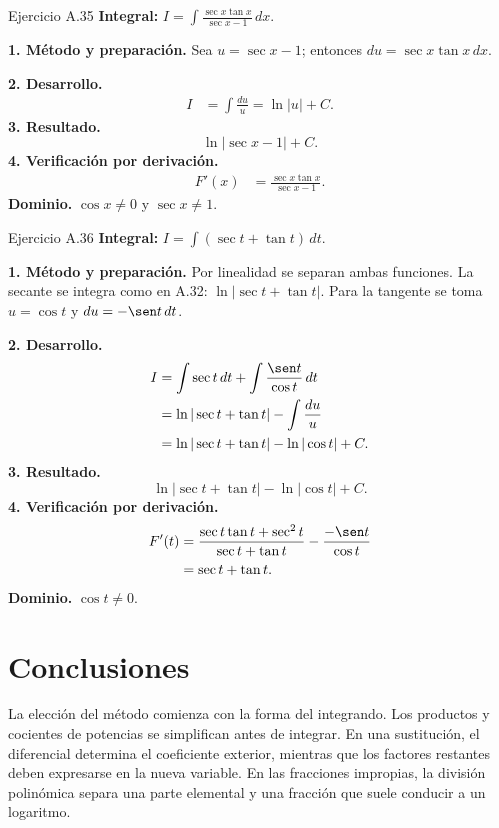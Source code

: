 \begin{examplebox}{Ejercicio A.35}
\textbf{Integral:} $\displaystyle I=\int \frac{\sec x\tan x}{\sec x-1}\,dx$.

\textbf{1. Método y preparación.} Sea $u=\sec x-1$; entonces $du=\sec x\tan x\,dx$.

\textbf{2. Desarrollo.}
\begin{align*}
I&=\int\frac{du}{u}=\ln|u|+C.
\end{align*}
\textbf{3. Resultado.}
\[
\ln|\sec x-1|+C.
\]
\textbf{4. Verificación por derivación.}
\begin{align*}
F'(x)&=\frac{\sec x\tan x}{\sec x-1}.
\end{align*}
\textbf{Dominio.} $\cos x\ne0$ y $\sec x\ne1$.
\end{examplebox}

\begin{examplebox}{Ejercicio A.36}
\textbf{Integral:} $\displaystyle I=\int (\sec t+\tan t)\,dt$.

\textbf{1. Método y preparación.} Por linealidad se separan ambas funciones. La secante se integra como en A.32: $\ln|\sec t+\tan t|$. Para la tangente se toma $u=\cos t$ y $du=-\sen t\,dt$.

\textbf{2. Desarrollo.}
\begin{align*}
I&=\int\sec t\,dt+\int\frac{\sen t}{\cos t}\,dt\\&=\ln|\sec t+\tan t|-\int\frac{du}{u}\\&=\ln|\sec t+\tan t|-\ln|\cos t|+C.
\end{align*}
\textbf{3. Resultado.}
\[
\ln|\sec t+\tan t|-\ln|\cos t|+C.
\]
\textbf{4. Verificación por derivación.}
\begin{align*}
F'(t)&=\frac{\sec t\tan t+\sec^2t}{\sec t+\tan t}-\frac{-\sen t}{\cos t}\\&=\sec t+\tan t.
\end{align*}
\textbf{Dominio.} $\cos t\ne0$.
\end{examplebox}


\section{Conclusiones}
La elección del método comienza con la forma del integrando. Los productos y cocientes de potencias se simplifican antes de integrar. En una sustitución, el diferencial determina el coeficiente exterior, mientras que los factores restantes deben expresarse en la nueva variable. En las fracciones impropias, la división polinómica separa una parte elemental y una fracción que suele conducir a un logaritmo.

